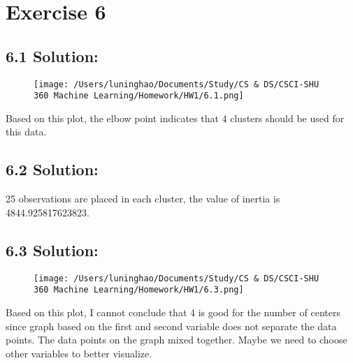 \documentclass{article}
\begin{document}
\newpage
\section*{Exercise 6}
\subsection*{6.1 Solution:}
\begin{figure}[h]
    \centering
    \texttt{[image: /Users/luninghao/Documents/Study/CS \& DS/CSCI-SHU 360 Machine Learning/Homework/HW1/6.1.png]}
\end{figure}
Based on this plot, the elbow point indicates that 4 clusters should be used for this data.

\subsection*{6.2 Solution:}
25 observations are placed in each cluster, the value of inertia is 4844.925817623823.
\subsection*{6.3 Solution:}
\begin{figure}[h]
    \centering
    \texttt{[image: /Users/luninghao/Documents/Study/CS \& DS/CSCI-SHU 360 Machine Learning/Homework/HW1/6.3.png]}
\end{figure}
Based on this plot, I cannot conclude that 4 is good for the number of centers since graph based on the first and second variable does not separate the data points. The data points on the graph mixed together. Maybe we need to choose other variables to better visualize.
\end{document}
